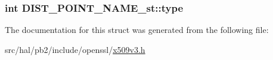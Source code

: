 \subsubsection[{\texorpdfstring{type}{type}}]{\setlength{\rightskip}{0pt plus 5cm}int D\+I\+S\+T\+\_\+\+P\+O\+I\+N\+T\+\_\+\+N\+A\+M\+E\+\_\+st\+::type}\hypertarget{struct_d_i_s_t___p_o_i_n_t___n_a_m_e__st_a86c9aa0170afe2c241c5536f45d15b46}{}\label{struct_d_i_s_t___p_o_i_n_t___n_a_m_e__st_a86c9aa0170afe2c241c5536f45d15b46}


The documentation for this struct was generated from the following file\+:\begin{DoxyCompactItemize}
\item 
src/hal/pb2/include/openssl/\hyperlink{x509v3_8h}{x509v3.\+h}\end{DoxyCompactItemize}

